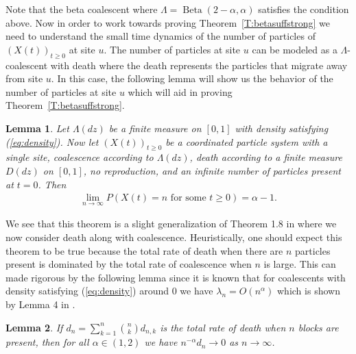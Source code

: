 \documentclass[11pt]{article}
\newtheorem{lemma}{Lemma}
\theoremstyle{definition}
\newcommand{\Beta}{\operatorname{Beta}}
\newcommand{\thmref}[1]{Theorem~\ref{T:#1}}
\begin{document}
\noindent Note that the beta coalescent where $\Lambda = \Beta(2-\alpha, \alpha)$ satisfies the condition above. Now in order to work towards proving \thmref{betasuffstrong} we need to understand the small time dynamics of the number of particles of $(X(t))_{t \geq 0}$ at site $u$. The number of particles at site $u$ can be modeled as a $\Lambda$-coalescent with death where the death represents the particles that migrate away from site $u$. In this case, the following lemma will show us the behavior of the number of particles at site $u$ which will aid in proving \thmref{betasuffstrong}.

\begin{lemma}\label{L:percenthit}
    Let $\Lambda(dz)$ be a finite measure on $[0,1]$ with density satisfying \emph{(}\ref{eq:density}\emph{)}. Now let $(X(t))_{t \geq 0}$ be a coordinated particle system with a single site, coalescence according to $\Lambda(dz)$, death according to a finite measure $D(dz)$ on $[0,1]$, no reproduction, and an infinite number of particles present at $t = 0$. Then
    \begin{align*}
        \lim_{n \to \infty} P(X(t) = n \text{ for some $t \geq 0$}) = \alpha - 1.
    \end{align*}
\end{lemma}

\noindent We see that this theorem is a slight generalization of Theorem 1.8 in \cite{betasmalltime} where we now consider death along with coalescence. Heuristically, one should expect this theorem to be true because the total rate of death when there are $n$ particles present is dominated by the total rate of coalescence when $n$ is large. This can made rigorous by the following lemma since it is known that for coalescents with density satisfying (\ref{eq:density}) around $0$ we have $\lambda_n = O(n^\alpha)$ which is shown by Lemma 4 in \cite{stochasticflows3}.

\begin{lemma}\label{L:asymptoticdeathrate}
    If $d_n = \sum_{k = 1}^n \binom{n}{k} d_{n,k}$ is the total rate of death when $n$ blocks are present, then for all $\alpha \in (1,2)$ we have $n^{-\alpha}d_n \to 0$ as $n \to \infty$.
\end{lemma}
\end{document}
